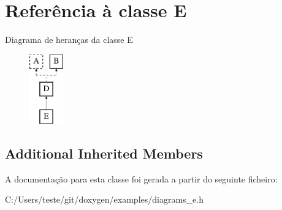 \hypertarget{class_e}{\section{Referência à classe E}
\label{class_e}
}
Diagrama de heranças da classe E\begin{figure}[H]
\begin{center}
\leavevmode
\includegraphics[height=3.000000cm]{class_e}
\end{center}
\end{figure}
\subsection*{Additional Inherited Members}


A documentação para esta classe foi gerada a partir do seguinte ficheiro\-:\begin{DoxyCompactItemize}
\item 
C\-:/\-Users/teste/git/doxygen/examples/diagrams\-\_\-e.\-h\end{DoxyCompactItemize}

